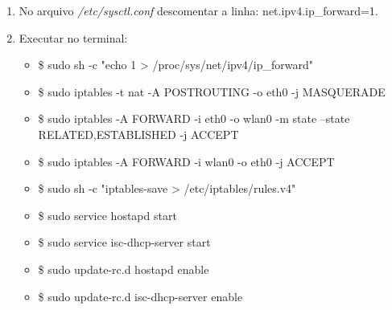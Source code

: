 \begin{enumerate}
    \item No arquivo \textit{/etc/sysctl.conf} descomentar a linha: net.ipv4.ip\_forward=1.

    \item Executar no terminal:
        \begin{itemize}
            \item \$ sudo sh -c "echo 1 > /proc/sys/net/ipv4/ip\_forward"
   
            \item \$ sudo iptables -t nat -A POSTROUTING -o eth0 -j MASQUERADE
   
            \item \$ sudo iptables -A FORWARD -i eth0 -o wlan0 -m state --state RELATED,ESTABLISHED -j ACCEPT

            \item \$ sudo iptables -A FORWARD -i wlan0 -o eth0 -j ACCEPT 

            \item \$ sudo sh -c "iptables-save > /etc/iptables/rules.v4"

            \item \$ sudo service hostapd start

            \item \$ sudo service isc-dhcp-server start

            \item \$ sudo update-rc.d hostapd enable

            \item \$ sudo update-rc.d isc-dhcp-server enable

        \end{itemize}
\end{enumerate}